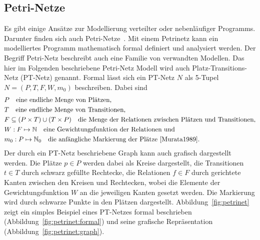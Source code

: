\subsection{Petri-Netze}\label{sec:petri}
Es gibt einige Ansätze zur Modellierung verteilter oder nebenläufiger \glspl{Programm}. Darunter finden sich auch Petri-Netze~\cite{Murata1989}. Mit einem Petrinetz kann ein modelliertes \gls{Programm} mathematisch formal definiert und analysiert werden. Der Begriff Petri-Netz beschreibt auch eine Familie von verwandten Modellen. Das hier im Folgenden beschriebene Petri-Netz Modell wird auch Platz-Transitions-Netz (PT-Netz) genannt. Formal lässt sich ein PT-Netz $N$ als 5-Tupel $ N=(P,T,F,W,m_0)$ beschreiben. Dabei sind 
\begin{align*}
	&P  \quad \text{eine endliche Menge von Plätzen,}\\
	&T  \quad \text{eine endliche Menge von Transitionen,}\\
	&F \subseteq (P\times T) \cup (T \times P) \quad \text{die Menge der Relationen zwischen Plätzen und Transitionen,}\\
	&W: F \mapsto \mathbb{N}  \quad \text{eine Gewichtungsfunktion der Relationen und}\\
	&m_0: P \mapsto \mathbb{N}_0   \quad \text{die anfängliche Markierung der Plätze~\cite{Murata1989}.}\\
\end{align*}
Der durch ein PT-Netz beschriebene Graph kann auch grafisch dargestellt werden. Die Plätze $p \in P$ werden dabei als Kreise dargestellt, die Transitionen $ t \in T$ durch schwarz gefüllte Rechtecke, die Relationen $ f \in F$ durch gerichtete Kanten zwischen den Kreisen und Rechtecken, wobei die Elemente der Gewichtungsfunktion $W$ an die jeweiligen Kanten gesetzt werden. Die Markierung wird durch schwarze Punkte in den Plätzen dargestellt. Abbildung~\vref{fig:petrinet} zeigt ein simples Beispiel eines PT-Netzes  formal beschrieben (Abbildung~\vref{fig:petrinet:formal}) und seine grafische Repräsentation (Abbildung~\vref{fig:petrinet:graph}).

